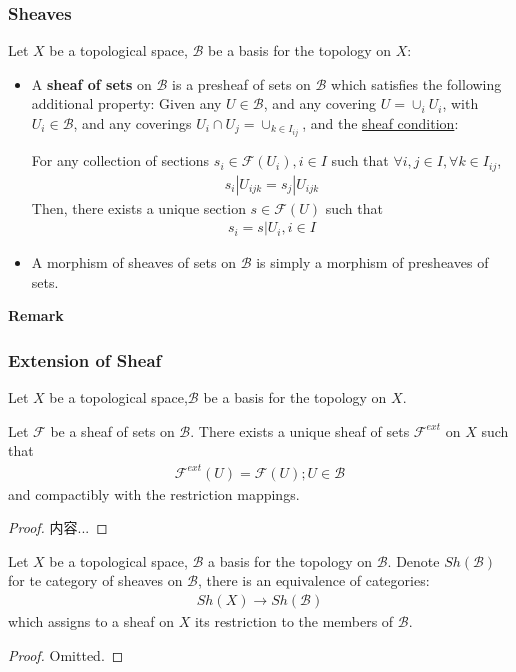 \documentclass[Total.tex]{subfiles}
\begin{document}
				\subsubsection{Sheaves}
				\begin{Def}
					Let $X$ be a topological space, $\mathcal{B}$ be a basis for the topology on $X$:
					\begin{itemize}
						\item A \textbf{sheaf of sets} on $\mathcal{B}$ is a presheaf of sets on $\mathcal{B}$ which satisfies the following additional property: Given any $U\in \mathcal{B}$, and any covering $U=\cup_i U_i$, with $U_i\in \mathcal{B}$, and any coverings $U_i\cap U_j=\cup_{k\in I_{ij}}$, and the \underline{sheaf condition}: 
						
						For any collection of sections $s_i\in \mathcal{F}(U_i),i\in I$ such that $\forall i,j\in I,\forall k\in I_{ij}$,
						\begin{gather*}
							s_i|U_{ijk}=s_j|U_{ijk}
						\end{gather*}
						Then, there exists a unique section $s\in \mathcal{F}(U)$ such that
						\begin{gather*}
							s_i=s|U_i,i\in I
						\end{gather*}
						\item A morphism of sheaves of sets on $\mathcal{B}$ is simply a morphism of presheaves of sets.
					\end{itemize}
				\end{Def}
				\textbf{Remark}
				\subsubsection{Extension of Sheaf}
				\begin{lemma}
					Let $X$ be a topological space,$\mathcal{B}$ be a basis for the topology on $X$.
					
					Let $\mathcal{F}$ be a sheaf of sets on $\mathcal{B}$. There exists a unique sheaf of sets $\mathcal{F}^{ext}$ on $X$ such that
					\begin{gather*}
						\mathcal{F}^{ext}(U)=\mathcal{F}(U);U\in \mathcal{B}
					\end{gather*}
					and compactibly with the restriction mappings.
				\end{lemma}
				\begin{proof}
					内容...
				\end{proof}
				
				\begin{corollary}
					Let $X$ be a topological space, $\mathcal{B}$ a basis for the topology on $\mathcal{B}$. Denote $Sh(\mathcal{B})$ for te category of sheaves on $\mathcal{B}$, there is an equivalence of categories:
					\begin{gather*}
						Sh(X)\rightarrow Sh(\mathcal{B})
					\end{gather*}
					which assigns to a sheaf on $X$ its restriction to the members of $\mathcal{B}$.
				\end{corollary}
				\begin{proof}
					Omitted.
				\end{proof}
\end{document}
